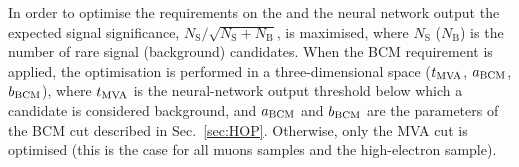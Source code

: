 In order to optimise the requirements on the \mbcm and the neural network output the expected
signal significance, $N_{\mathrm{S}}/\sqrt{N_{\mathrm{S}}+N_{\mathrm{B}}}$, is maximised,
where $N_\mathrm{S}$ ($N_\mathrm{B}$) is the number of rare signal (background) candidates.
When the BCM requirement is applied, the optimisation is performed in a three-dimensional space
($t_{\rm MVA}$, $a_{\rm BCM}$, $b_{\rm BCM}$), where $t_{\rm MVA}$ is the neural-network output threshold below which
a candidate is considered background, and $a_{\rm BCM}$ and $b_{\rm BCM}$ are the parameters of the BCM
cut described in Sec.~\ref{sec:HOP}. Otherwise, only the MVA cut is optimised 
(this is the case for all muons samples and the high-\qsq electron sample).


